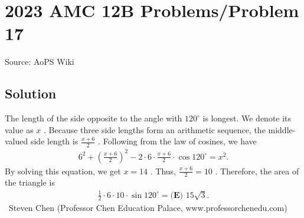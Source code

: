 \documentclass[12pt]{article}
\begin{document}
\section*{{2023 AMC 12B Problems/Problem 17}}
Source: AoPS Wiki

\subsection*{Solution}
The length of the side opposite to the angle with $120^\circ$ is longest.
We denote its value as $x$ . Because three side lengths form an arithmetic sequence, the middle-valued side length is $\frac{x + 6}{2}$ . Following from the law of cosines, we have \begin{align*} 6^2 + \left( \frac{x + 6}{2} \right)^2 - 2 \cdot 6 \cdot \frac{x + 6}{2} \cdot \cos 120^\circ = x^2 . \end{align*} By solving this equation, we get $x = 14$ .
Thus, $\frac{x + 6}{2} = 10$ . Therefore, the area of the triangle is \begin{align*} \frac{1}{2} \cdot 6 \cdot 10 \cdot \sin 120^\circ = \boxed{\textbf{(E) } 15 \sqrt{3}} . \end{align*} ~Steven Chen (Professor Chen Education Palace, www.professorchenedu.com)
\end{document}
